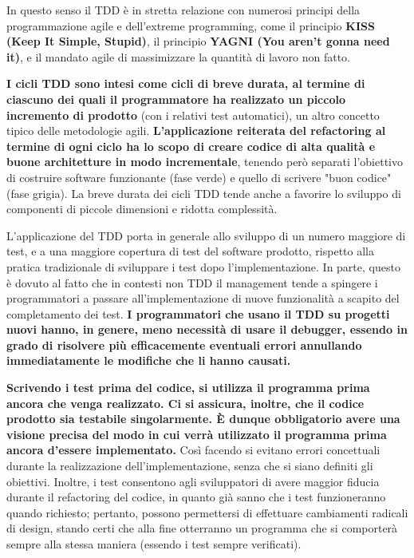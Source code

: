 \documentclass[11pt,a4paper]{book}
\begin{document}
In questo senso il TDD è in stretta relazione con numerosi principi della programmazione agile e dell'extreme programming, come il principio \textbf{KISS (Keep It Simple, Stupid)}, il principio \textbf{YAGNI (You aren't gonna need it)}, e il mandato agile di massimizzare la quantità di lavoro non fatto.

\textbf{I cicli TDD sono intesi come cicli di breve durata, al termine di ciascuno dei quali il programmatore ha realizzato un piccolo incremento di prodotto} (con i relativi test automatici), un altro concetto tipico delle metodologie agili.\textbf{ L'applicazione reiterata del refactoring al termine di ogni ciclo ha lo scopo di creare codice di alta qualità e buone architetture in modo incrementale}, tenendo però separati l'obiettivo di costruire software funzionante (fase verde) e quello di scrivere "buon codice" (fase grigia). La breve durata dei cicli TDD tende anche a favorire lo sviluppo di componenti di piccole dimensioni e ridotta complessità.

L'applicazione del TDD porta in generale allo sviluppo di un numero maggiore di test, e a una maggiore copertura di test del software prodotto, rispetto alla pratica tradizionale di sviluppare i test dopo l'implementazione. In parte, questo è dovuto al fatto che in contesti non TDD il management tende a spingere i programmatori a passare all'implementazione di nuove funzionalità a scapito del completamento dei test. \textbf{I programmatori che usano il TDD su progetti nuovi hanno, in genere, meno necessità di usare il debugger, essendo in grado di risolvere più efficacemente eventuali errori annullando immediatamente le modifiche che li hanno causati.}

\textbf{Scrivendo i test prima del codice, si utilizza il programma prima ancora che venga realizzato. Ci si assicura, inoltre, che il codice prodotto sia testabile singolarmente. È dunque obbligatorio avere una visione precisa del modo in cui verrà utilizzato il programma prima ancora d'essere implementato.} Così facendo si evitano errori concettuali durante la realizzazione dell'implementazione, senza che si siano definiti gli obiettivi. Inoltre, i test consentono agli sviluppatori di avere maggior fiducia durante il refactoring del codice, in quanto già sanno che i test funzioneranno quando richiesto; pertanto, possono permettersi di effettuare cambiamenti radicali di design, stando certi che alla fine otterranno un programma che si comporterà sempre alla stessa maniera (essendo i test sempre verificati).
\end{document}

